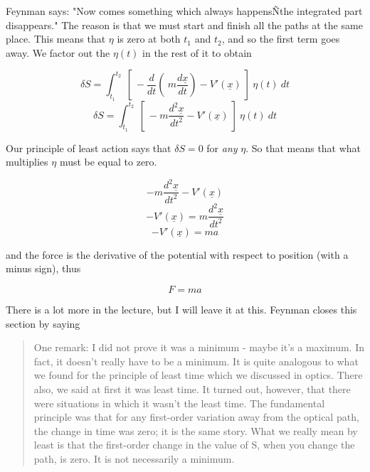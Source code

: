 \documentclass[11pt, oneside]{article}   	%
\begin{document}
Feynman says:  "Now comes something which always happensÑthe integrated part disappears."  The reason is that we must start and finish all the paths at the same place.  This means that $\eta$ is zero at both $t_1$ and $t_2$, and so the first term goes away.  We factor out the $\eta(t)$ in the rest of it to obtain

\[ \delta S =   \int_{t_1}^{t_2} \ [ \ -\frac{d}{dt} (\  m \frac{d\underline{x}}{dt}) - V'(\underline{x}) \ ] \  \eta(t) \ dt \]
\[ \delta S =   \int_{t_1}^{t_2} \ [ \ - m \frac{d^2\underline{x}}{dt^2} - V'(\underline{x}) \ ] \  \eta(t) \ dt \]

Our principle of least action says that $\delta S = 0$ for \emph{any} $\eta$.  So that means that what multiplies $\eta$ must be equal to zero.

\[ - m \frac{d^2\underline{x}}{dt^2} - V'(\underline{x})  \]
\[ - V'(\underline{x})  = m \frac{d^2\underline{x}}{dt^2}  \]
\[ - V'(\underline{x})  = m a  \]

and the force is the derivative of the potential with respect to position (with a minus sign), thus

\[ F  = m a  \]

There is a lot more in the lecture, but I will leave it at this.  Feynman closes this section by saying 

\begin{quote}One remark: I did not prove it was a minimum - maybe it's a maximum. In fact, it doesn't really have to be a minimum. It is quite analogous to what we found for the principle of least time which we discussed in optics. There also, we said at first it was least time. It turned out, however, that there were situations in which it wasn't the least time. The fundamental principle was that for any first-order variation away from the optical path, the change in time was zero; it is the same story. What we really mean by least is that the first-order change in the value of S, when you change the path, is zero. It is not necessarily a minimum. \end{quote}
\end{document}
